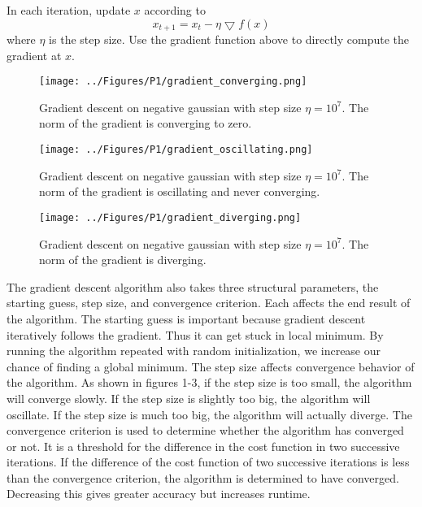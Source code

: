 \documentclass[a4paper,twoside]{article}
\begin{document}
\noindent In each iteration, update $x$ according to 
\begin{equation}
x_{t+1} = x_{t} - \eta \bigtriangledown f(x)
\end{equation}
where $\eta$ is the step size. Use the gradient function above to directly compute the gradient at $x$.

\begin{figure}[h]
  \texttt{[image: ../Figures/P1/gradient\_converging.png]}
  \caption{Gradient descent on negative gaussian with step size $\eta = 10^7$. The norm of the gradient is converging to zero.}
  \label{fig:gradient_converging}
\end{figure}

\begin{figure}[h]
  \texttt{[image: ../Figures/P1/gradient\_oscillating.png]}
  \caption{Gradient descent on negative gaussian with step size $\eta = 10^7$. The norm of the gradient is oscillating and never converging.}
  \label{fig:gradient_oscillating}
\end{figure}

\begin{figure}[h]
  \texttt{[image: ../Figures/P1/gradient\_diverging.png]}
  \caption{Gradient descent on negative gaussian with step size $\eta = 10^7$. The norm of the gradient is diverging.}
  \label{fig:gradient_converging}
\end{figure}

The gradient descent algorithm also takes three structural parameters, the starting guess, step size, and convergence criterion. Each affects the end result of the algorithm. The starting guess is important because gradient descent iteratively follows the gradient. Thus it can get stuck in local minimum. By running the algorithm repeated with random initialization, we increase our chance of finding a global minimum. The step size affects convergence behavior of the algorithm. As shown in figures 1-3, if the step size is too small, the algorithm will converge slowly. If the step size is slightly too big, the algorithm will oscillate. If the step size is much too big, the algorithm will actually diverge. The convergence criterion is used to determine whether the algorithm has converged or not. It is a threshold for the difference in the cost function in two successive iterations. If the difference of the cost function of two successive iterations is less than the convergence criterion, the algorithm is determined to have converged. Decreasing this gives greater accuracy but increases runtime.
\end{document}
